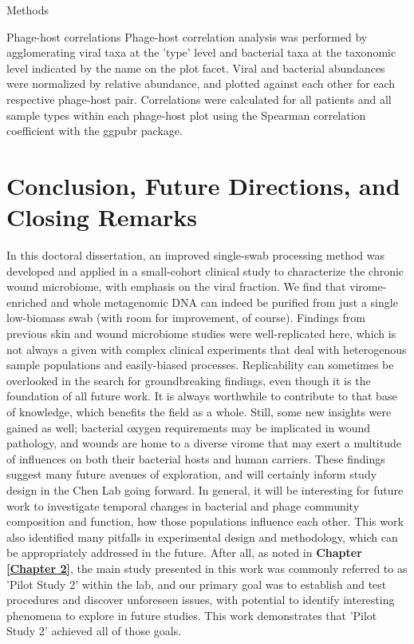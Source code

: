 \documentclass[oneside,12pt,final]{sty/ucthesis-CA2012}
\begin{document}
\begin{mainmatter}
\begin{section}{Methods}
\begin{subsection}{Phage-host correlations}
Phage-host correlation analysis was performed by agglomerating viral taxa at the 'type' level and bacterial taxa at the taxonomic level indicated by the name on the plot facet. Viral and bacterial abundances were normalized by relative abundance, and plotted against each other for each respective phage-host pair. Correlations were calculated for all patients and all sample types within each phage-host plot using the Spearman correlation coefficient with the ggpubr package.
\end{subsection}

\end{section}

\chapter{Conclusion, Future Directions, and Closing Remarks}
\label{fin}

In this doctoral dissertation, an improved single-swab processing method was developed and applied in a small-cohort clinical study to characterize the chronic wound microbiome, with emphasis on the viral fraction. We find that virome-enriched and whole metagenomic DNA can indeed be purified from just a single low-biomass swab (with room for improvement, of course). Findings from previous skin and wound microbiome studies were well-replicated here, which is not always a given with complex clinical experiments that deal with heterogenous sample populations and easily-biased processes. Replicability can sometimes be overlooked in the search for groundbreaking findings, even though it is the foundation of all future work. It is always worthwhile to contribute to that base of knowledge, which benefits the field as a whole. Still, some new insights were gained as well; bacterial oxygen requirements may be implicated in wound pathology, and wounds are home to a diverse virome that may exert a multitude of influences on both their bacterial hosts and human carriers. These findings suggest many future avenues of exploration, and will certainly inform study design in the Chen Lab going forward. In general, it will be interesting for future work to investigate temporal changes in bacterial and phage community composition and function, how those populations influence each other. This work also identified many pitfalls in experimental design and methodology, which can be appropriately addressed in the future. After all, as noted in \textbf{Chapter \ref{Chapter 2}}, the main study presented in this work was commonly referred to as 'Pilot Study 2' within the lab, and our primary goal was to establish and test procedures and discover unforeseen issues, with potential to identify interesting phenomena to explore in future studies. This work demonstrates that 'Pilot Study 2' achieved all of those goals.


\end{mainmatter}
\end{document}
